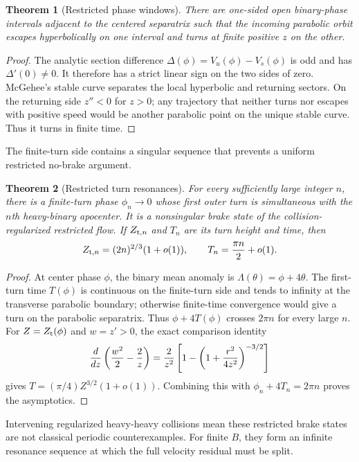 \documentclass[11pt]{article}
\newtheorem{theorem}{Theorem}
\begin{document}
\begin{theorem}[Restricted phase windows]
There are one-sided open binary-phase intervals adjacent to the centered
separatrix such that the incoming parabolic orbit escapes hyperbolically on
one interval and turns at finite positive $z$ on the other.
\end{theorem}
\begin{proof}
The analytic section difference
$\Delta(\phi)=V_u(\phi)-V_s(\phi)$ is odd and has
$\Delta'(0)\ne0$. It therefore has a strict linear sign on the two sides of
zero. McGehee's stable curve separates the local hyperbolic and returning
sectors. On the returning side $z''<0$ for $z>0$; any trajectory that neither
turns nor escapes with positive speed would be another parabolic point on the
unique stable curve. Thus it turns in finite time.
\end{proof}

The finite-turn side contains a singular sequence that prevents a uniform
restricted no-brake argument.

\begin{theorem}[Restricted turn resonances]
For every sufficiently large integer $n$, there is a finite-turn phase
$\phi_n\to0$ whose first outer turn is simultaneous with the $n$th heavy-binary
apocenter. It is a nonsingular brake state of the collision-regularized
restricted flow. If $Z_{{\rm t},n}$ and $T_n$ are its turn height and time,
then
\[
Z_{{\rm t},n}=(2n)^{2/3}(1+o(1)),\qquad
T_n={\pi n\over2}+o(1).
\]
\end{theorem}
\begin{proof}
At center phase $\phi$, the binary mean anomaly is
$\Lambda(\theta)=\phi+4\theta$. The first-turn time $T(\phi)$ is continuous
on the finite-turn side and tends to infinity at the transverse parabolic
boundary; otherwise finite-time convergence would give a turn on the
parabolic separatrix. Thus $\phi+4T(\phi)$ crosses $2\pi n$ for every large
$n$. For $Z=Z_{\rm t}(\phi)$ and $w=z'>0$, the exact comparison identity
\[
{d\over dz}\left({w^2\over2}-{2\over z}\right)
={2\over z^2}\left[1-\left(1+{r^2\over4z^2}\right)^{-3/2}\right]
\]
gives $T=(\pi/4)Z^{3/2}(1+o(1))$. Combining this with
$\phi_n+4T_n=2\pi n$ proves the asymptotics.
\end{proof}

Intervening regularized heavy-heavy collisions mean these restricted brake
states are not classical periodic counterexamples. For finite $B$, they form
an infinite resonance sequence at which the full velocity residual must be
split.
\end{document}
